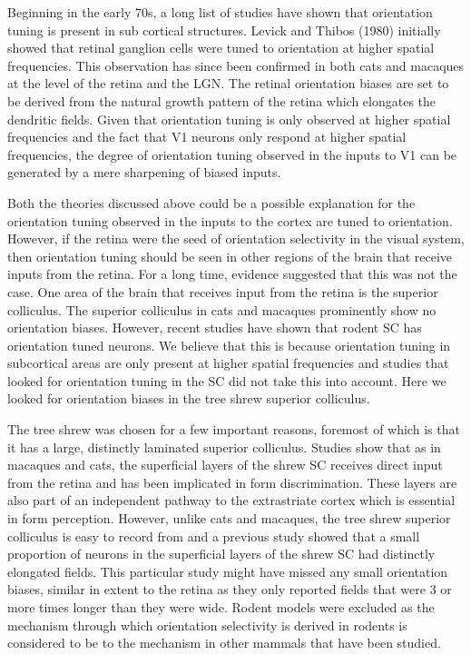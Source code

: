 	Beginning in the early 70s, a long list of studies have shown that orientation tuning is present in sub cortical structures. Levick and Thibos (1980) initially showed that retinal ganglion cells were tuned to orientation at higher spatial frequencies. This observation has since been confirmed in both cats and macaques at the level of the retina and the LGN. The retinal orientation biases are set to be derived from the natural growth pattern of the retina which elongates the dendritic fields. Given that orientation tuning is only observed at higher spatial frequencies and the fact that V1 neurons only respond at higher spatial frequencies, the degree of orientation tuning observed in the inputs to V1 can be generated by a mere sharpening of biased inputs. 
	
	Both the theories discussed above could be a possible explanation for the orientation tuning observed in the inputs to the cortex are tuned to orientation. However, if the retina were the seed of orientation selectivity in the visual system, then orientation tuning should be seen in other regions of the brain that receive inputs from the retina. For a long time, evidence suggested that this was not the case. One area of the brain that receives input from the retina is the superior colliculus. The superior colliculus in cats and macaques prominently show no orientation biases. However, recent studies have shown that rodent SC has orientation tuned neurons. We believe that this is because orientation tuning in subcortical areas are only present at higher spatial frequencies and studies that looked for orientation tuning in the SC did not take this into account. Here we looked for orientation biases in the tree shrew superior colliculus.
	
	The tree shrew was chosen for a few important reasons, foremost of which is that it has a large, distinctly laminated superior colliculus. Studies show that as in macaques and cats, the superficial layers of the shrew SC receives direct input from the retina and has been implicated in form discrimination. These layers are also part of an independent pathway to the extrastriate cortex which is essential in form perception. However, unlike cats and macaques, the tree shrew superior colliculus is easy to record from and a previous study showed that a small proportion of neurons in the superficial layers of the shrew SC had distinctly elongated fields. This particular study might have missed any small orientation biases, similar in extent to the retina as they only reported fields that were 3 or more times longer than they were wide. Rodent models were excluded as the mechanism through which orientation selectivity is derived in rodents is considered to be to the mechanism in other mammals that have been studied.
		
